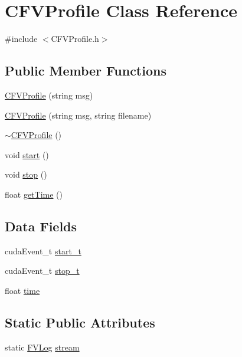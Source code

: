 \hypertarget{classFVL_1_1CFVProfile}{
\section{CFVProfile Class Reference}
\label{d4/d21/classFVL_1_1CFVProfile}
}


{\ttfamily \#include $<$CFVProfile.h$>$}

\subsection*{Public Member Functions}
\begin{DoxyCompactItemize}
\item 
\hyperlink{classFVL_1_1CFVProfile_ad5a2b875ea5bd04b1671bfa5f2a5d2dd}{CFVProfile} (string msg)
\item 
\hyperlink{classFVL_1_1CFVProfile_ae2a7a171a17d3d75a9f1e9d29824dd29}{CFVProfile} (string msg, string filename)
\item 
\hyperlink{classFVL_1_1CFVProfile_ae76a82bce4a3c32d7d003ce0f483e936}{$\sim$CFVProfile} ()
\item 
void \hyperlink{classFVL_1_1CFVProfile_a60de64d75454385b23995437f1d72669}{start} ()
\item 
void \hyperlink{classFVL_1_1CFVProfile_a8c528baf37154d347366083f0f816846}{stop} ()
\item 
float \hyperlink{classFVL_1_1CFVProfile_a02903a3a418cbb9675a4b928f6f62faf}{getTime} ()
\end{DoxyCompactItemize}
\subsection*{Data Fields}
\begin{DoxyCompactItemize}
\item 
cudaEvent\_\-t \hyperlink{classFVL_1_1CFVProfile_a1e3f4a6461ec09e22b9a53be916a99da}{start\_\-t}
\item 
cudaEvent\_\-t \hyperlink{classFVL_1_1CFVProfile_af43943dcc9c2ea9f3617901c89566b4b}{stop\_\-t}
\item 
float \hyperlink{classFVL_1_1CFVProfile_a8b8dfe2335a5bf90695960dc6a1c5d3b}{time}
\end{DoxyCompactItemize}
\subsection*{Static Public Attributes}
\begin{DoxyCompactItemize}
\item 
static \hyperlink{classFVL_1_1FVLog}{FVLog} \hyperlink{classFVL_1_1CFVProfile_a0be27d2b6072a83dbea8a4e16b22495f}{stream}
\end{DoxyCompactItemize}


